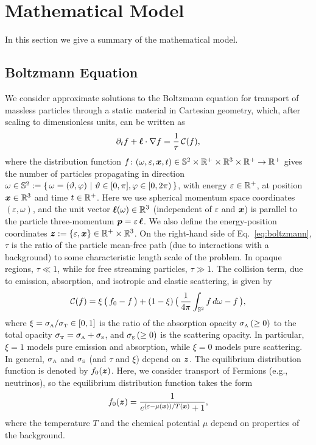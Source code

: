 \section{Mathematical Model}
\label{sec:model}

In this section we give a summary of the mathematical model.  

\subsection{Boltzmann Equation}

We consider approximate solutions to the Boltzmann equation for transport of massless particles through a static material in Cartesian geometry, which, after scaling to dimensionless units, can be written as
\begin{equation}
  \pd{f}{t}+\vect{\ell}\cdot\nabla f
  =\f{1}{\tau}\,\cC(f),
  \label{eq:boltzmann}
\end{equation}
where the distribution function $f\colon(\omega,\varepsilon,\boldsymbol{x},t)\in\mathbb{S}^{2}\times\mathbb{R}^{+}\times\mathbb{R}^{3}\times\mathbb{R}^{+}\to\mathbb{R}^{+}$ gives the number of particles propagating in direction $\omega\in\mathbb{S}^{2}:=\{\,\omega=(\vartheta,\varphi)~|~\vartheta\in[0,\pi],\varphi\in[0,2\pi)\,\}$, with energy $\varepsilon\in\mathbb{R}^{+}$, at position $\boldsymbol{x}\in\mathbb{R}^{3}$ and time $t\in\mathbb{R}^{+}$.  
Here we use spherical momentum space coordinates $(\varepsilon,\omega)$, and the unit vector $\boldsymbol{\ell}(\omega)\in\mathbb{R}^{3}$ (independent of $\varepsilon$ and $\boldsymbol{x}$) is parallel to the particle three-momentum $\boldsymbol{p}=\varepsilon\,\boldsymbol{\ell}$.  
We also define the energy-position coordinates $\boldsymbol{z}:=\{\varepsilon,\boldsymbol{x}\}\in\mathbb{R}^{+}\times\mathbb{R}^{3}$.  
On the right-hand side of Eq.~\eqref{eq:boltzmann}, $\tau$ is the ratio of the particle mean-free path (due to interactions with a background) to some characteristic length scale of the problem.  
In opaque regions, $\tau\ll1$, while for free streaming particles, $\tau\gg1$.  
The collision term, due to emission, absorption, and isotropic and elastic scattering, is given by
\begin{equation}
  \cC(f)=\xi\,\big(\,f_{0}-f\,\big)
  +(1-\xi)\,\big(\,\f{1}{4\pi}\int_{\bbS^{2}}f\,d\omega-f\,\big),
  \label{eq:collisionTerm}
\end{equation}
where $\xi=\sigma_{\mbox{\tiny A}}/\sigma_{\mbox{\tiny T}}\in[0,1]$ is the ratio of the absorption opacity $\sigma_{\mbox{\tiny A}}\,(\ge0)$ to the total opacity $\sigma_{\mbox{\tiny T}}=\sigma_{\mbox{\tiny A}}+\sigma_{\mbox{\tiny S}}$, and $\sigma_{\mbox{\tiny S}}\,(\ge0)$ is the scattering opacity.  
In particular, $\xi=1$ models pure emission and absorption, while $\xi=0$ models pure scattering.  
In general, $\sigma_{\mbox{\tiny A}}$ and $\sigma_{\mbox{\tiny S}}$ (and $\tau$ and $\xi$) depend on $\boldsymbol{z}$.  
The equilibrium distribution function is denoted by $f_{0}(\boldsymbol{z})$.  
Here, we consider transport of Fermions (e.g., neutrinos), so the equilibrium distribution function takes the form
\begin{equation}
  f_{0}(\vect{z})=\f{1}{e^{(\varepsilon-\mu(\vect{x}))/T(\vect{x})}+1},  
  \label{eq:fermiDirac}
\end{equation}
where the temperature $T$ and the chemical potential $\mu$ depend on properties of the background.  

